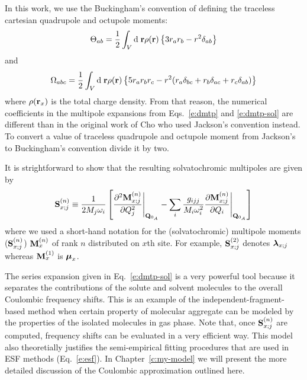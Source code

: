 \documentclass[a4paper,titlepage,twoside,fleqn,12pt]{book}
\newcommand{\BM}[1]{\ensuremath{\mbox{\boldmath${#1}$}}}
\begin{document}
\begin{refsection}
In this work, we use the Buckingham's convention of defining the traceless cartesian
quadrupole and octupole moments:\citep{Buckingham.QRevChemSoc.1959} 
%
\begin{equation} \label{e:quad-trac}
\Theta_{ab} = \frac{1}{2} \int_V {\rm d}\;{\bf r} \rho({\bf r}) \left\{ 3r_ar_b-r^2 \delta_{ab}\right\}
\end{equation}
%
and 
%
\begin{equation} \label{e:oct-trac}
\Omega_{abc} = \frac{1}{2} \int_V {\rm d}\;{\bf r} \rho({\bf r}) \left\{ 5r_ar_br_c-r^2(r_a\delta_{bc}+
                                                                     r_b\delta_{ac}+
                                                                     r_c\delta_{ab})\right\}
\end{equation}
%
where $\rho({\bf r}_x)$ is the total charge density.
From that reason, the numerical coefficients in the multipole expansions 
from Eqs.~\eqref{e:dmtp} and \eqref{e:dmtp-sol}
are different than in the original work of Cho\citep{Cho.JCP.2009} who used 
Jackson's convention instead.\citep{Jackson.ClassicalElectrodynamics.1998} 
To convert a value of traceless
quadrupole and octupole moment from Jackson's to Buckingham's convention
divide it by two.

It is strightforward to show that the resulting solvatochromic multipoles
are given by
%
\begin{equation} \label{e:solvatochromic-multipoles}
 {\bf S}^{(n)}_{x;j} \equiv \frac{1}{2M_j\omega_i} \left[ 
     \frac{\partial^2 {\bf M}^{(n)}_{x;j} }{\partial Q_j^2} \Bigg|_{{\bf Q}_{0_A}}
-
\sum_i \frac{g_{ijj}}{M_i\omega_i^2} 
\frac{\partial {\bf M}^{(n)}_{x;j} }{\partial Q_i} \Bigg|_{{\bf Q}_{0_A}}
\right]
\end{equation}
%
where we used a short\hyp{}hand notation for the (solvatochromic) multipole moments
(${\bf S}^{(n)}_{x;j}$) ${\bf M}^{(n)}_{x}$
of rank $n$ distributed on $x$th site. For example, ${\bf S}^{(2)}_{x;j}$
denotes ${\BM \lambda}_{x;j}$ whereas ${\bf M}^{(1)}_{x}$ is ${\BM \mu}_x$.

The series expansion given in Eq.~\eqref{e:dmtp-sol} is a very powerful tool because
it separates the contributions of the solute and solvent molecules to the overall Coulombic
frequency shifts. This is an example of the independent-fragment-based method
when certain property of molecular aggregate can be modeled by the properties
of the isolated molecules in gas phase. Note that, once ${\bf S}^{(n)}_{x;j}$
are computed, frequency shifts can be evaluated in a very efficient way.
This model also theoretially justifies the semi\hyp{}empirical fitting procedures 
that are used in ESF methods (Eq.~\eqref{e:esf}).
In Chapter~\ref{c:my-model} we will present the more detailed discussion of the Coulombic
approximation outlined here.



\end{refsection}
\end{document}
